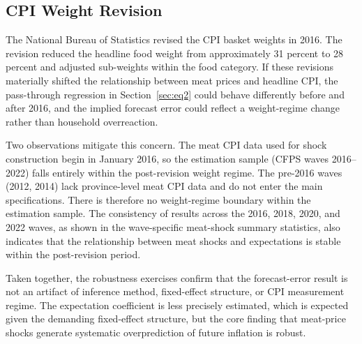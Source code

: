 \subsection{CPI Weight Revision}\label{sec:cpi_weights}

The National Bureau of Statistics revised the CPI basket
weights in 2016.
The revision reduced the headline food weight from
approximately 31 percent to 28 percent and adjusted
sub-weights within the food category.
If these revisions materially shifted the relationship
between meat prices and headline CPI, the pass-through
regression in Section~\ref{sec:eq2} could behave
differently before and after 2016, and the implied forecast
error could reflect a weight-regime change rather than
household overreaction.

Two observations mitigate this concern.
The meat CPI data used for shock construction begin in
January 2016, so the estimation sample (CFPS waves 2016--2022)
falls entirely within the post-revision weight regime.
The pre-2016 waves (2012, 2014) lack province-level meat CPI
data and do not enter the main specifications.
There is therefore no weight-regime boundary within the
estimation sample.
The consistency of results across the 2016, 2018,
2020, and 2022 waves, as shown in the wave-specific
meat-shock summary statistics, also indicates that the
relationship between meat shocks and expectations is stable
within the post-revision period.

Taken together, the robustness exercises confirm that the
forecast-error result is not an artifact of inference method,
fixed-effect structure, or CPI measurement regime.
The expectation coefficient is less precisely estimated,
which is expected given the demanding fixed-effect structure,
but the core finding that meat-price shocks generate
systematic overprediction of future inflation is robust.
